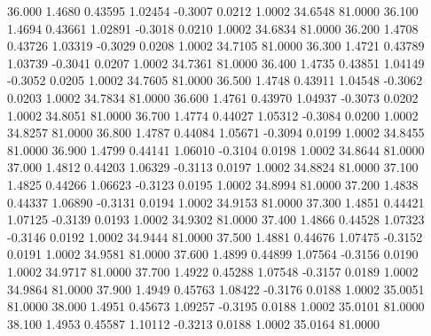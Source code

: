   36.000   1.4680   0.43595   1.02454  -0.3007   0.0212   1.0002  34.6548  81.0000
  36.100   1.4694   0.43661   1.02891  -0.3018   0.0210   1.0002  34.6834  81.0000
  36.200   1.4708   0.43726   1.03319  -0.3029   0.0208   1.0002  34.7105  81.0000
  36.300   1.4721   0.43789   1.03739  -0.3041   0.0207   1.0002  34.7361  81.0000
  36.400   1.4735   0.43851   1.04149  -0.3052   0.0205   1.0002  34.7605  81.0000
  36.500   1.4748   0.43911   1.04548  -0.3062   0.0203   1.0002  34.7834  81.0000
  36.600   1.4761   0.43970   1.04937  -0.3073   0.0202   1.0002  34.8051  81.0000
  36.700   1.4774   0.44027   1.05312  -0.3084   0.0200   1.0002  34.8257  81.0000
  36.800   1.4787   0.44084   1.05671  -0.3094   0.0199   1.0002  34.8455  81.0000
  36.900   1.4799   0.44141   1.06010  -0.3104   0.0198   1.0002  34.8644  81.0000
  37.000   1.4812   0.44203   1.06329  -0.3113   0.0197   1.0002  34.8824  81.0000
  37.100   1.4825   0.44266   1.06623  -0.3123   0.0195   1.0002  34.8994  81.0000
  37.200   1.4838   0.44337   1.06890  -0.3131   0.0194   1.0002  34.9153  81.0000
  37.300   1.4851   0.44421   1.07125  -0.3139   0.0193   1.0002  34.9302  81.0000
  37.400   1.4866   0.44528   1.07323  -0.3146   0.0192   1.0002  34.9444  81.0000
  37.500   1.4881   0.44676   1.07475  -0.3152   0.0191   1.0002  34.9581  81.0000
  37.600   1.4899   0.44899   1.07564  -0.3156   0.0190   1.0002  34.9717  81.0000
  37.700   1.4922   0.45288   1.07548  -0.3157   0.0189   1.0002  34.9864  81.0000
  37.900   1.4949   0.45763   1.08422  -0.3176   0.0188   1.0002  35.0051  81.0000
  38.000   1.4951   0.45673   1.09257  -0.3195   0.0188   1.0002  35.0101  81.0000
  38.100   1.4953   0.45587   1.10112  -0.3213   0.0188   1.0002  35.0164  81.0000
